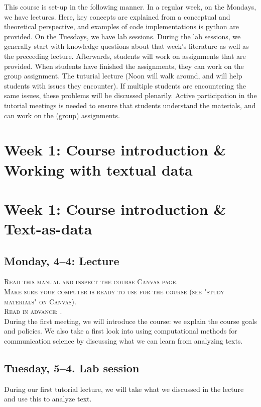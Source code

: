 This course is set-up in the following manner. In a regular week, on the Mondays, we have lectures. Here, key concepts are explained from a conceptual and theoretical perspective, and examples of code implementations is python are provided.  On the Tuesdays, we have lab sessions. During the lab sessions, we generally start with knowledge questions about that week's literature as well as the preceeding lecture. Afterwards, students will work on assignments that are provided. When students have finished the assignments, they can work on the group assignment. The tuturial lecture (Noon will walk around, and will help students with issues they encounter). If multiple students are encountering the same issues, these problems will be discussed plenarily. Active participation in the tutorial meetings is needed to ensure that students understand the materials, and can work on the (group) assignments.

\section*{Week 1: Course introduction \& Working with textual data}



\section*{Week 1: Course introduction \& Text-as-data}


\subsection*{Monday, 4--4: Lecture}
\textsc{ Read this manual and inspect the course Canvas page.}\\
\textsc{ Make sure your computer is ready to use for the course (see "study materials" on Canvas).}\\
\textsc{ Read in advance: \cite{hirschberg_manning}.} \\

During the first meeting, we will introduce the course: we explain the course goals and policies. We also take a first look into using computational methods for communication science by discussing what we can learn from analyzing texts.


\subsection*{Tuesday, 5--4. Lab session}
During our first tutorial lecture, we will take what we discussed in the lecture and use this to analyze text.

